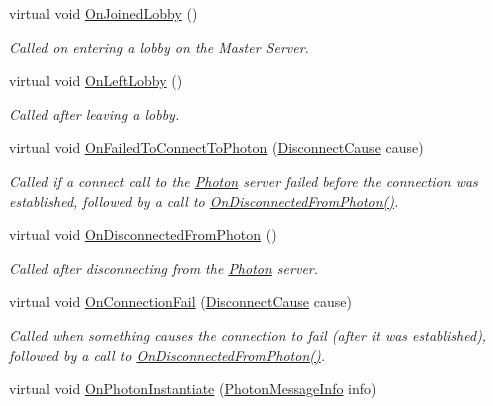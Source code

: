 \begin{DoxyCompactItemize}
virtual void \hyperlink{class_photon_1_1_pun_behaviour_a17686ad2c9bfdf6e64b8883792c81fee}{On\+Joined\+Lobby} ()
\begin{DoxyCompactList}\small\item\em Called on entering a lobby on the Master Server. \end{DoxyCompactList}\item 
virtual void \hyperlink{class_photon_1_1_pun_behaviour_a0c64cd0591992e70393d719e07e09f6f}{On\+Left\+Lobby} ()
\begin{DoxyCompactList}\small\item\em Called after leaving a lobby. \end{DoxyCompactList}\item 
virtual void \hyperlink{class_photon_1_1_pun_behaviour_a03bc6b8a9fffa6a7e7b43ff793ad2b28}{On\+Failed\+To\+Connect\+To\+Photon} (\hyperlink{group__public_api_gad61b1461cf60ad9e8d86923d111d5cc9}{Disconnect\+Cause} cause)
\begin{DoxyCompactList}\small\item\em Called if a connect call to the \hyperlink{namespace_photon}{Photon} server failed before the connection was established, followed by a call to \hyperlink{class_photon_1_1_pun_behaviour_a57675c88d17befc4746b7812a69b6b93}{On\+Disconnected\+From\+Photon()}. \end{DoxyCompactList}\item 
virtual void \hyperlink{class_photon_1_1_pun_behaviour_a57675c88d17befc4746b7812a69b6b93}{On\+Disconnected\+From\+Photon} ()
\begin{DoxyCompactList}\small\item\em Called after disconnecting from the \hyperlink{namespace_photon}{Photon} server. \end{DoxyCompactList}\item 
virtual void \hyperlink{class_photon_1_1_pun_behaviour_a44be8bdd38ea28a1f540d38aede43bde}{On\+Connection\+Fail} (\hyperlink{group__public_api_gad61b1461cf60ad9e8d86923d111d5cc9}{Disconnect\+Cause} cause)
\begin{DoxyCompactList}\small\item\em Called when something causes the connection to fail (after it was established), followed by a call to \hyperlink{class_photon_1_1_pun_behaviour_a57675c88d17befc4746b7812a69b6b93}{On\+Disconnected\+From\+Photon()}. \end{DoxyCompactList}\item 
virtual void \hyperlink{class_photon_1_1_pun_behaviour_a2f6b448cd6a97e4281d543196872d29a}{On\+Photon\+Instantiate} (\hyperlink{class_photon_message_info}{Photon\+Message\+Info} info)

\end{DoxyCompactItemize}
